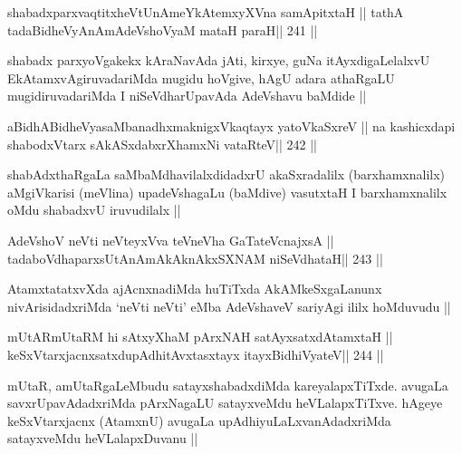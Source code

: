 
\begin{shl}
shabadxparxvaqtitxheVtUnAmeYkAtemxyXVna samApitxtaH ||
tathA tadaBidheVyAnAmAdeVshoV\s yaM mataH paraH\hfill || 241 ||
\end{shl}

\begin{artha}
shabadx parxyoVgakekx kAraNavAda jAti, kirxye, guNa itAyxdigaLelalxvU
EkAtamxvAgiruvadariMda mugidu hoVgive, hAgU adara athaRgaLU
mugidiruvadariMda I niSeVdharUpavAda AdeVshavu baMdide ||
\end{artha}

\begin{shl}
aBidhABidheVyasaMbanadhxmaknigxVkaqtayx yatoV\s kaSxreV ||
na kashicxdapi shabodxV\s tarx sAkASxdabxrXhamxNi vataRteV\hfill || 242 ||
\end{shl}

\begin{artha}
shabAdxthaRgaLa saMbaMdhavilalxdidadxrU akaSxradalilx
(barxhamxnalilx) aMgiVkarisi (meVlina) upadeVshagaLu (baMdive)
vasutxtaH I barxhamxnalilx oMdu shabadxvU iruvudilalx ||
\end{artha}


\begin{shl}
AdeVshoV neVti neVteyxVva teVneVha GaTateV\s cnajxsA ||
tadaboVdhaparxsUtAnAmAkAknAkxSXNAM niSeVdhataH\hfill || 243 ||
\end{shl}

\begin{artha}
AtamxtatatxvXda ajAcnxnadiMda huTiTxda AkAMkeSxgaLanunx
nivArisidadxriMda `neVti neVti' eMba AdeVshaveV sariyAgi
ililx hoMduvudu ||
\end{artha}


\begin{shl}
mUtARmUtaRM hi sAtxyXhaM pArxNAH satAyxsatxdAtamxtaH ||
keSxVtarxjacnxsatxdupAdhitAvxtasxtayx itayxBidhiVyateV\hfill || 244 ||
\end{shl}

\begin{artha}
mUtaR, amUtaRgaLeMbudu satayxshabadxdiMda kareyalapxTiTxde. avugaLa
savxrUpavAdadxriMda pArxNagaLU satayxveMdu heVLalapxTiTxve. hAgeye
keSxVtarxjacnx (AtamxnU) avugaLa upAdhiyuLaLxvanAdadxriMda satayxveMdu
heVLalapxDuvanu ||
\end{artha}

